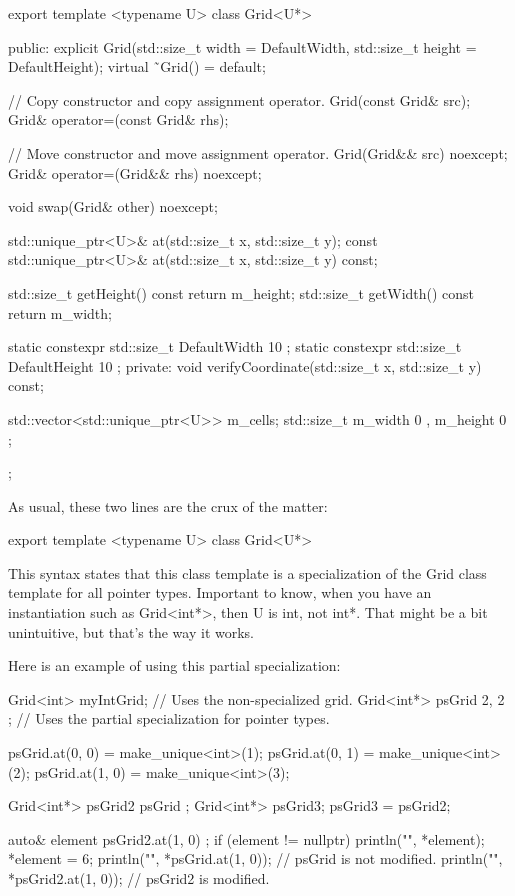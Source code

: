 \begin{cpp}
export template <typename U>
class Grid<U*>
{
    public:
        explicit Grid(std::size_t width = DefaultWidth,
            std::size_t height = DefaultHeight);
        virtual ˜Grid() = default;

        // Copy constructor and copy assignment operator.
        Grid(const Grid& src);
        Grid& operator=(const Grid& rhs);

        // Move constructor and move assignment operator.
        Grid(Grid&& src) noexcept;
        Grid& operator=(Grid&& rhs) noexcept;

        void swap(Grid& other) noexcept;

        std::unique_ptr<U>& at(std::size_t x, std::size_t y);
        const std::unique_ptr<U>& at(std::size_t x, std::size_t y) const;

        std::size_t getHeight() const { return m_height; }
        std::size_t getWidth() const { return m_width; }

        static constexpr std::size_t DefaultWidth { 10 };
        static constexpr std::size_t DefaultHeight { 10 };
    private:
        void verifyCoordinate(std::size_t x, std::size_t y) const;

        std::vector<std::unique_ptr<U>> m_cells;
        std::size_t m_width { 0 }, m_height { 0 };
};
\end{cpp}

As usual, these two lines are the crux of the matter:

\begin{cpp}
export template <typename U>
class Grid<U*>
\end{cpp}

This syntax states that this class template is a specialization of the Grid class template for all pointer types. Important to know, when you have an instantiation such as Grid<int*>, then U is int, not int*. That might be a bit unintuitive, but that’s the way it works.

Here is an example of using this partial specialization:

\begin{cpp}
Grid<int> myIntGrid; // Uses the non-specialized grid.
Grid<int*> psGrid { 2, 2 }; // Uses the partial specialization for pointer types.

psGrid.at(0, 0) = make_unique<int>(1);
psGrid.at(0, 1) = make_unique<int>(2);
psGrid.at(1, 0) = make_unique<int>(3);

Grid<int*> psGrid2 { psGrid };
Grid<int*> psGrid3;
psGrid3 = psGrid2;

auto& element { psGrid2.at(1, 0) };
if (element != nullptr) {
    println("{}", *element);
    *element = 6;
}
println("{}", *psGrid.at(1, 0)); // psGrid is not modified.
println("{}", *psGrid2.at(1, 0)); // psGrid2 is modified.
\end{cpp}


